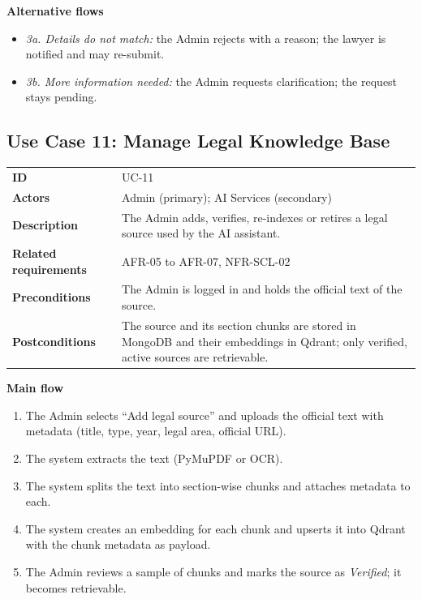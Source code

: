 \textbf{Alternative flows}

\begin{itemize}
  \item \emph{3a. Details do not match:} the Admin rejects with a reason; the lawyer is notified and may re-submit.
  \item \emph{3b. More information needed:} the Admin requests clarification; the request stays pending.
\end{itemize}

\subsection{Use Case 11: Manage Legal Knowledge Base}

\begin{center}
\begin{tabular}{|L{2.94cm}|L{11.99cm}|}
\hline\headrow {} &  \\ \hline
\textbf{ID} & UC-11 \\ \hline
\textbf{Actors} & Admin (primary); AI Services (secondary) \\ \hline
\textbf{Description} & The Admin adds, verifies, re-indexes or retires a legal source used by the AI assistant. \\ \hline
\textbf{Related requirements} & AFR-05 to AFR-07, NFR-SCL-02 \\ \hline
\textbf{Preconditions} & The Admin is logged in and holds the official text of the source. \\ \hline
\textbf{Postconditions} & The source and its section chunks are stored in MongoDB and their embeddings in Qdrant; only verified, active sources are retrievable. \\ \hline
\end{tabular}
\end{center}

\textbf{Main flow}

\begin{enumerate}
  \item The Admin selects ``Add legal source'' and uploads the official text with metadata (title, type, year, legal area, official URL).
  \item The system extracts the text (PyMuPDF or OCR).
  \item The system splits the text into section-wise chunks and attaches metadata to each.
  \item The system creates an embedding for each chunk and upserts it into Qdrant with the chunk metadata as payload.
  \item The Admin reviews a sample of chunks and marks the source as \emph{Verified}; it becomes retrievable.
\end{enumerate}

